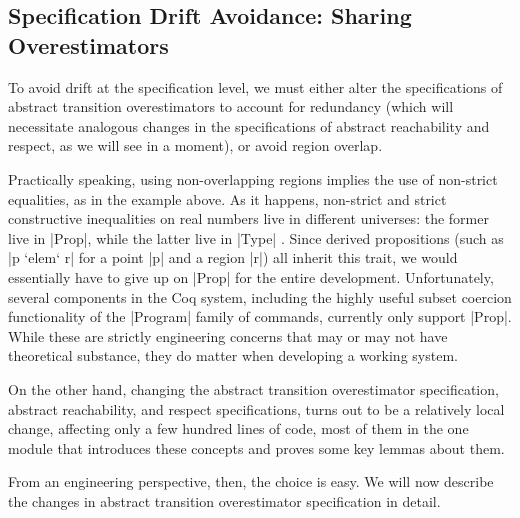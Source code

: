 \documentclass[runningheads]{llncs}
\begin{document}
{

\subsection{Specification Drift Avoidance: Sharing Overestimators}

To avoid drift at the specification level, we must either alter the specifications of abstract transition overestimators to account for redundancy (which will necessitate analogous changes in the specifications of abstract reachability and respect, as we will see in a moment), or avoid region overlap.

Practically speaking, using non-overlapping regions implies the use of non-strict equalities, as in the example above. As it happens, non-strict and strict constructive inequalities on real numbers live in different universes: the former live in |Prop|, while the latter live in |Type| . Since derived propositions (such as |p `elem` r| for a point |p| and a region |r|) all inherit this trait, we would essentially have to give up on |Prop| for the entire development. Unfortunately, several components in the Coq system, including the highly useful subset coercion functionality of the |Program| family of commands, currently only support |Prop|. While these are strictly engineering concerns that may or may not have theoretical substance, they do matter when developing a working system.

On the other hand, changing the abstract transition overestimator specification, abstract reachability, and respect specifications, turns out to be a relatively local change, affecting only a few hundred lines of code, most of them in the one module that introduces these concepts and proves some key lemmas about them.

From an engineering perspective, then, the choice is easy. We will now describe the changes in abstract transition overestimator specification in detail.


}
\end{document}
